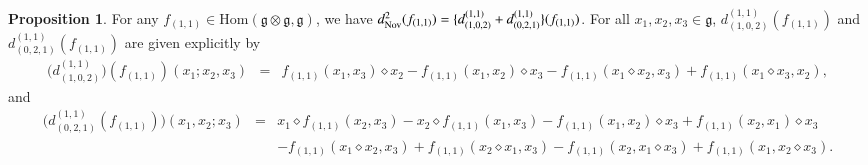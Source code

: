\documentclass[12pt]{amsart}
\theoremstyle{definition}
\newtheorem{pro}[thm]{Proposition}
\newcommand{\g}{\mathfrak g}
\newcommand{\Hom}{\mathrm{Hom}}
\newcommand{\ot}{\otimes}
\newcommand{\ff}{f_{(1,1)}}
\newcommand{\nov}{{\rm Nov}}
\begin{document}
\begin{pro}\label{pro:formular 2-d}
	For any $f_{(1,1)}\in \Hom(\g\ot\g,\g)$, we have $d_{\nov}^2(f_{(1,1)})=   \{d_{(1,0,2)}^{(1,1)}+d_{(0,2,1)}^{(1,1)}\}(f_{(1,1)})$. For all $x_1,x_2,x_3\in \g$, $d_{(1,0,2)}^{(1,1)}(f_{(1,1)})$ and $d_{(0,2,1)}^{(1,1)}(f_{(1,1)})$ are given explicitly by
	\begin{eqnarray*}
		 \big(d_{(1,0,2)}^{(1,1)}\big)(f_{(1,1)})(x_1;x_2,x_3)
		&=&\ff(x_1,x_3)\diamond x_2-\ff(x_1,x_2)\diamond x_3-\ff(x_1\diamond x_2,x_3)+\ff(x_1\diamond x_3,x_2),
	\end{eqnarray*}
	and
	\begin{eqnarray*}
		 \big(d_{(0,2,1)}^{(1,1)}(f_{(1,1)})\big)(x_1,x_2;x_3)
		&=&x_1\diamond\ff(x_2,x_3)-x_2\diamond\ff(x_1,x_3)-\ff(x_1,x_2)\diamond x_3+\ff(x_2,x_1)\diamond x_3\\
		&&-\ff(x_1\diamond x_2,x_3)+\ff(x_2\diamond x_1,x_3)-\ff(x_2,x_1\diamond x_3)+\ff(x_1,x_2\diamond x_3).
	\end{eqnarray*}
\end{pro}
\end{document}
